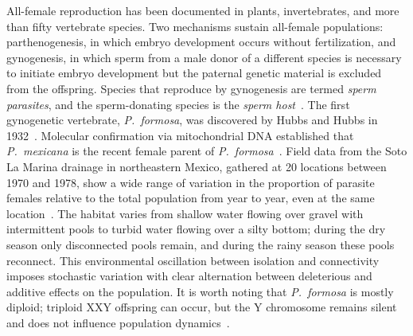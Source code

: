\documentclass[12pt]{article}
\begin{document}
All-female reproduction has been documented in plants, invertebrates, and more than fifty vertebrate species.  Two mechanisms sustain all-female populations: parthenogenesis, in which embryo development occurs without fertilization, and gynogenesis, in which sperm from a male donor of a different species is necessary to initiate embryo development but the paternal genetic material is excluded from the offspring.  Species that reproduce by gynogenesis are termed \textit{sperm parasites}, and the sperm-donating species is the \textit{sperm host}~\citep{Kokko2008}.  The first gynogenetic vertebrate, \textit{P.~formosa}, was discovered by Hubbs and Hubbs in 1932~\citep{Hubbs1932}.  Molecular confirmation via mitochondrial DNA established that \textit{P.~mexicana} is the recent female parent of \textit{P.~formosa}~\citep{Avise1991}.  Field data from the Soto La Marina drainage in northeastern Mexico, gathered at 20 locations between 1970 and 1978, show a wide range of variation in the proportion of parasite females relative to the total population from year to year, even at the same location~\citep{Balsano1989}.  The habitat varies from shallow water flowing over gravel with intermittent pools to turbid water flowing over a silty bottom; during the dry season only disconnected pools remain, and during the rainy season these pools reconnect.  This environmental oscillation between isolation and connectivity imposes stochastic variation with clear alternation between deleterious and additive effects on the population.  It is worth noting that \textit{P.~formosa} is mostly diploid; triploid XXY offspring can occur, but the Y chromosome remains silent and does not influence population dynamics~\citep{Balsano1989}.
\end{document}
